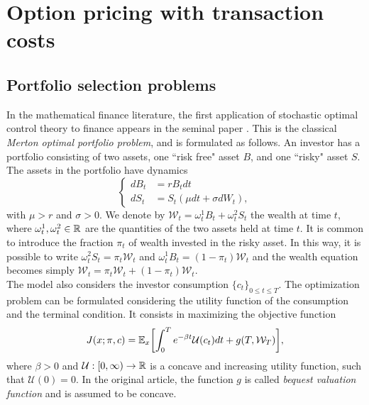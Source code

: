 

\chapter{Option pricing with transaction costs}\label{Chapter5}
\minitoc%

\vspace{5em}

\section{Portfolio selection problems}
In the mathematical finance literature, the first application of stochastic optimal control theory to finance appears in the seminal paper \cite{Me69}.
This is the classical \emph{Merton optimal portfolio problem}, and is formulated as follows. An investor has a portfolio consisting of two assets, one ``risk free" asset $B$,
and one ``risky" asset $S$. The assets in the portfolio have dynamics
\begin{equation}\label{Merton_problem1}
 \begin{cases}
 dB_t &=  rB_t dt \\
 dS_t &=  S_t \left( \mu dt + \sigma dW_t \right),
\end{cases}
\end{equation} 
with $\mu>r$ and $\sigma>0$. We denote by $\mathcal{W}_t = \omega^1_t B_t + \omega^2_t S_t$  the wealth at time $t$, where $\omega^1_t, \omega^2_t \in \mathbb{R}$ 
are the quantities of the two assets held at time $t$.
It is common to introduce the fraction $\pi_t$ of wealth invested in the risky asset. 
In this way, it is possible to write
$\omega^2_t S_t = \pi_t \mathcal{W}_t$ and $\omega^1_t B_t = (1-\pi_t) \mathcal{W}_t$ and the wealth equation becomes simply 
$\mathcal{W}_t = \pi_t \mathcal{W}_t + (1-\pi_t) \mathcal{W}_t$. \\ 
The model also considers the investor consumption $\{c_t\}_{0 \leq t \leq T}$. 
The optimization problem can be formulated considering the utility function of the consumption and the terminal condition. It consists in maximizing the objective function
\begin{equation}
 J(x;\pi,c) = \mathbb{E}_x \biggl[ \int_0^{T} e^{-\beta t} \mathcal{U}(c_t) dt + g(T,\mathcal{W}_T) \biggr],
\end{equation}
where $\beta > 0$ and $\mathcal{U}: [0,\infty) \to \mathbb{R}$ is a concave and increasing utility function, such that $\mathcal{U}(0)=0$.
In the original article, the function $g$ is called \emph{bequest valuation function} and is assumed to be concave.
